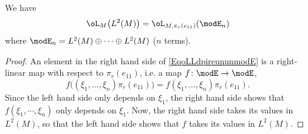 \begin{lemma}
	We have
	\begin{equation}		\label{EqoLLdpireununmodE}
		\oL_M\big( L^2(M) \big)=\oL_{M,\pi_r(e_{11})}(\modE_n)
	\end{equation}
	where $\modE_n=L^2(M)\oplus \cdots\oplus L^2(M)$ ($n$ terms).
\end{lemma}

\begin{proof}
	An element in the right hand side of \eqref{EqoLLdpireununmodE} is a right-linear map with respect to $\pi_r(e_{11})$, i.e. a map $f\colon \modE\to \modE$,
	\begin{equation}
		f\big( (\xi_1,\ldots,\xi_n)\pi_r(e_{11}) \big)=f(\xi_1,\ldots,\xi_n)\pi_r(e_{11}).
	\end{equation}
	Since the left hand side only depends on $\xi_1$, the right hand side  shows that $f(\xi_1,\cdots,\xi_n)$ only depends on $\xi_1$. Now, the right hand side takes its values in $L^2(M)$, so that the left hand side shows that $f$ takes its values in $L^2(M)$.
\end{proof}

